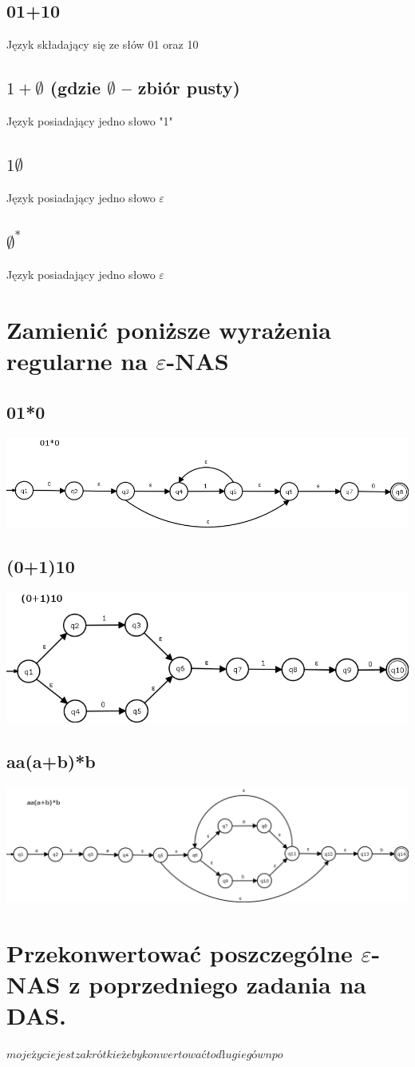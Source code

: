 \documentclass[a4paper,11pt]{article}
\begin{document}
\subsection{01+10}
Język składający się ze słów 01 oraz 10
\subsection{$1+\emptyset$ (gdzie $\emptyset$ – zbiór pusty)}
Język posiadający jedno słowo "1"
\subsection{$1\emptyset$}
Język posiadający jedno słowo $\varepsilon$
\subsection{$\emptyset^*$}
Język posiadający jedno słowo $\varepsilon$


\newpage
\section{Zamienić poniższe wyrażenia regularne na $\varepsilon$-NAS}
\subsection{01*0}
\includegraphics[scale=0.5]{10-1}
\subsection{(0+1)10}
\includegraphics[scale=0.6]{10-2}
\subsection{aa(a+b)*b}
\includegraphics[scale=0.4]{10-3}

\section{Przekonwertować poszczególne $\varepsilon$-NAS z poprzedniego zadania na DAS.}
$moje życie jest za krótkie żeby konwertować to długie gównpo$
\end{document}
